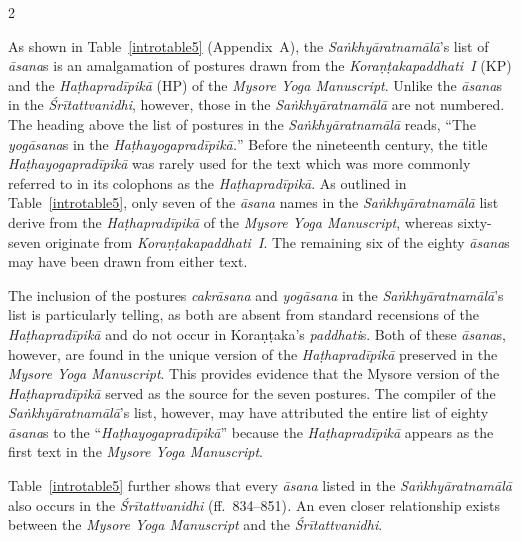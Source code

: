 \begin{nohyp}
\begin{multicols*}{2}
\begin{eng}
As shown in Table~\ref{introtable5} (Appendix~A), the \emph{Saṅkhyāratnamālā}'s list of \emph{āsana}s is an amalgamation of postures drawn from the \emph{Koraṇṭakapaddhati~I} (KP) and the \emph{Haṭhapradīpikā} (HP) of the \emph{Mysore Yoga Manuscript}. Unlike the \emph{āsana}s in the \emph{Śrītattvanidhi}, however, those in the \emph{Saṅkhyāratnamālā} are not numbered. The heading above the list of postures in the \emph{Saṅkhyāratnamālā} reads, ``The \emph{yogāsana}s in the \emph{Haṭhayogapradīpikā.}'' Before the nineteenth century, the title \emph{Haṭhayogapradīpikā} was rarely used for the text which was more commonly referred to in its colophons as the \emph{Haṭhapradīpikā}. As outlined in Table~\ref{introtable5}, only seven of the \emph{āsana} names in the \emph{Saṅkhyāratnamālā} list derive from the \emph{Haṭhapradīpikā} of the \emph{Mysore Yoga Manuscript}, whereas sixty-seven originate from \emph{Koraṇṭakapaddhati~I}. The remaining six of the eighty \emph{āsana}s may have been drawn from either text.

The inclusion of the postures \emph{cakrāsana} and \emph{yogāsana} in the \emph{Saṅkhyāratnamālā}'s list is particularly telling, as both are absent from standard recensions of the \emph{Haṭhapradīpikā} and do not occur in Koraṇṭaka's \emph{paddhati}s. Both of these \emph{āsana}s, however, are found in the unique version of the \emph{Haṭhapradīpikā} preserved in the \emph{Mysore Yoga Manuscript}. This provides evidence that the Mysore version of the \emph{Haṭhapradīpikā} served as the source for the seven postures. The compiler of the \emph{Saṅkhyāratnamālā}'s list, however, may have attributed the entire list of eighty \emph{āsana}s to the ``\emph{Haṭhayogapradīpikā}'' because the \emph{Haṭhapradīpikā} appears as the first text in the \emph{Mysore Yoga Manuscript}.

Table~\ref{introtable5} further shows that every \emph{āsana} listed in the \emph{Saṅkhyāratnamālā} also occurs in the \emph{Śrītattvanidhi} (ff.\ 834--851)\emph{.} An even closer relationship exists between the \emph{Mysore Yoga Manuscript} and the \emph{Śrītattvanidhi}.


\end{eng}
\end{multicols*}
\end{nohyp}
